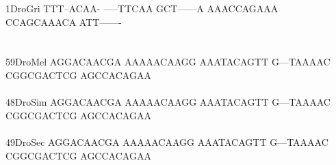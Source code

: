 \documentclass[11pt,twoside,reqno,a4paper]{article}
\begin{document}
{1\hspace*{3\charwidth}DroGri	TTT--ACAA-	-----TTCAA	GCT------A	AAACCAGAAA	CCAGCAAACA	ATT-------	\\
\hspace*{4\charwidth}\hspace*{7\charwidth}\hspace*{1\charwidth}\hspace*{1\charwidth}\hspace*{1\charwidth}\hspace*{1\charwidth}\hspace*{1\charwidth}\hspace*{1\charwidth}\\
\\
59\hspace*{2\charwidth}DroMel	AGGACAACGA	AAAAACAAGG	AAATACAGTT	G---TAAAAC	CGGCGACTCG	AGCCACAGAA	\\
\hspace*{4\charwidth}\hspace*{7\charwidth}\hspace*{1\charwidth}\hspace*{1\charwidth}\hspace*{1\charwidth}\hspace*{1\charwidth}\hspace*{1\charwidth}\hspace*{1\charwidth}\\
48\hspace*{2\charwidth}DroSim	AGGACAACGA	AAAAACAAGG	AAATACAGTT	G---TAAAAC	CGGCGACTCG	AGCCACAGAA	\\
\hspace*{4\charwidth}\hspace*{7\charwidth}\hspace*{1\charwidth}\hspace*{1\charwidth}\hspace*{1\charwidth}\hspace*{1\charwidth}\hspace*{1\charwidth}\hspace*{1\charwidth}\\
49\hspace*{2\charwidth}DroSec	AGGACAACGA	AAAAACAAGG	AAATACAGTT	G---TAAAAC	CGGCGACTCG	AGCCACAGAA	\\
\hspace*{4\charwidth}\hspace*{7\charwidth}\hspace*{1\charwidth}\hspace*{1\charwidth}\hspace*{1\charwidth}\hspace*{1\charwidth}\hspace*{1\charwidth}\hspace*{1\charwidth}\\
}
\end{document}

